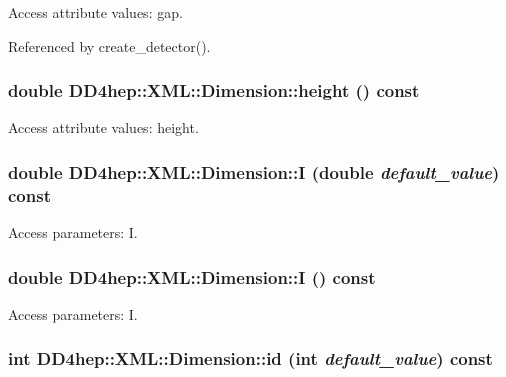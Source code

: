 Access attribute values: gap. 

Referenced by create\_\-detector().\hypertarget{struct_d_d4hep_1_1_x_m_l_1_1_dimension_ad8f940506be33fb90b4280535e7b6129}{
\subsubsection[{height}]{\setlength{\rightskip}{0pt plus 5cm}double DD4hep::XML::Dimension::height () const}}
\label{struct_d_d4hep_1_1_x_m_l_1_1_dimension_ad8f940506be33fb90b4280535e7b6129}


Access attribute values: height. \hypertarget{struct_d_d4hep_1_1_x_m_l_1_1_dimension_adb8e6bcde8a36e200891bb1ef77b12b8}{
\subsubsection[{I}]{\setlength{\rightskip}{0pt plus 5cm}double DD4hep::XML::Dimension::I (double {\em default\_\-value}) const}}
\label{struct_d_d4hep_1_1_x_m_l_1_1_dimension_adb8e6bcde8a36e200891bb1ef77b12b8}


Access parameters: I. \hypertarget{struct_d_d4hep_1_1_x_m_l_1_1_dimension_a89459b10038dd52bd1652e95f4229c1c}{
\subsubsection[{I}]{\setlength{\rightskip}{0pt plus 5cm}double DD4hep::XML::Dimension::I () const}}
\label{struct_d_d4hep_1_1_x_m_l_1_1_dimension_a89459b10038dd52bd1652e95f4229c1c}


Access parameters: I. \hypertarget{struct_d_d4hep_1_1_x_m_l_1_1_dimension_a563494ba6c6ded9dc528e66181bd5bd2}{
\subsubsection[{id}]{\setlength{\rightskip}{0pt plus 5cm}int DD4hep::XML::Dimension::id (int {\em default\_\-value}) const}}
\label{struct_d_d4hep_1_1_x_m_l_1_1_dimension_a563494ba6c6ded9dc528e66181bd5bd2}


